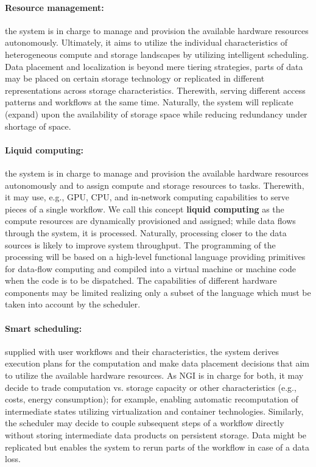 \documentclass[a4paper, twocolumn]{article}
\begin{document}
\paragraph{Resource management:}
the system is in charge to manage and provision the available hardware resources autonomously.
Ultimately, it aims to utilize the individual characteristics of heterogeneous compute and storage landscapes by utilizing intelligent scheduling.
Data placement and localization is beyond mere tiering strategies, parts of data may be placed on certain storage technology or replicated in different representations across storage characteristics.
Therewith, serving different access patterns and workflows at the same time.
Naturally, the system will replicate (expand) upon the availability of storage space while reducing redundancy under shortage of space.

\paragraph{Liquid computing:}
the system is in charge to manage and provision the available hardware resources autonomously and to assign compute and storage resources to tasks.
Therewith, it may use, e.g., GPU, CPU, and in-network computing capabilities to serve pieces of a single workflow.
We call this concept \textbf{liquid computing} as the compute resources are dynamically provisioned and assigned; while data flows through the system, it is processed.
Naturally, processing closer to the data sources is likely to improve system throughput.
The programming of the processing will be based on a high-level functional language providing primitives for data-flow computing and compiled into a virtual machine or machine code when the code is to be dispatched.
The capabilities of different hardware components may be limited realizing only a subset of the language which must be taken into account by the scheduler.


\paragraph{Smart scheduling:}
supplied with user workflows and their characteristics, the system derives execution plans for the computation and make data placement decisions that aim to utilize the available hardware resources.
As NGI is in charge for both, it may decide to trade computation vs. storage capacity or other characteristics (e.g., costs, energy consumption); for example, enabling automatic recomputation of intermediate states utilizing virtualization and container technologies.
Similarly, the scheduler may decide to couple subsequent steps of a workflow directly without storing intermediate data products on persistent storage.
Data might be replicated but enables the system to rerun parts of the workflow in case of a data loss.
\end{document}
